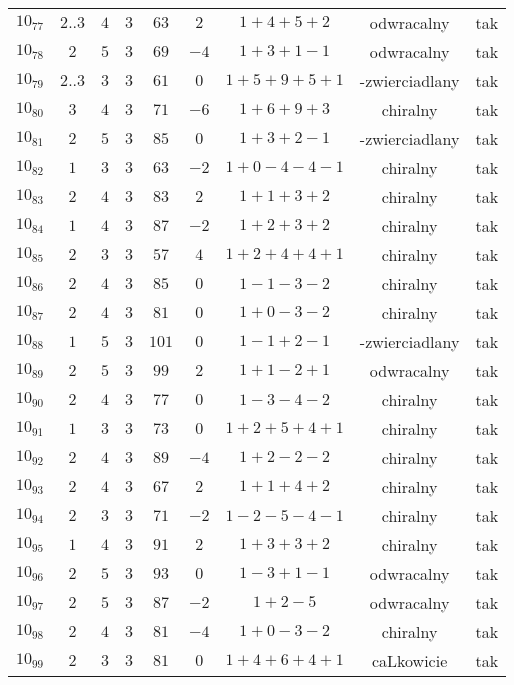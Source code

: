 \begin{longtable}{ccccccccc}
$10_{77}$ & $2..3$ & $4$ & $3$ & $63$ & $2$ & $1+4+5+2$ & odwracalny & tak \\
$10_{78}$ & $2$ & $5$ & $3$ & $69$ & $-4$ & $1+3+1-1$ & odwracalny & tak \\
$10_{79}$ & $2..3$ & $3$ & $3$ & $61$ & $0$ & $1+5+9+5+1$ & -zwierciadlany & tak \\
$10_{80}$ & $3$ & $4$ & $3$ & $71$ & $-6$ & $1+6+9+3$ & chiralny & tak \\
$10_{81}$ & $2$ & $5$ & $3$ & $85$ & $0$ & $1+3+2-1$ & -zwierciadlany & tak \\
$10_{82}$ & $1$ & $3$ & $3$ & $63$ & $-2$ & $1+0-4-4-1$ & chiralny & tak \\
$10_{83}$ & $2$ & $4$ & $3$ & $83$ & $2$ & $1+1+3+2$ & chiralny & tak \\
$10_{84}$ & $1$ & $4$ & $3$ & $87$ & $-2$ & $1+2+3+2$ & chiralny & tak \\
$10_{85}$ & $2$ & $3$ & $3$ & $57$ & $4$ & $1+2+4+4+1$ & chiralny & tak \\
$10_{86}$ & $2$ & $4$ & $3$ & $85$ & $0$ & $1-1-3-2$ & chiralny & tak \\
$10_{87}$ & $2$ & $4$ & $3$ & $81$ & $0$ & $1+0-3-2$ & chiralny & tak \\
$10_{88}$ & $1$ & $5$ & $3$ & $101$ & $0$ & $1-1+2-1$ & -zwierciadlany & tak \\
$10_{89}$ & $2$ & $5$ & $3$ & $99$ & $2$ & $1+1-2+1$ & odwracalny & tak \\
$10_{90}$ & $2$ & $4$ & $3$ & $77$ & $0$ & $1-3-4-2$ & chiralny & tak \\
$10_{91}$ & $1$ & $3$ & $3$ & $73$ & $0$ & $1+2+5+4+1$ & chiralny & tak \\
$10_{92}$ & $2$ & $4$ & $3$ & $89$ & $-4$ & $1+2-2-2$ & chiralny & tak \\
$10_{93}$ & $2$ & $4$ & $3$ & $67$ & $2$ & $1+1+4+2$ & chiralny & tak \\
$10_{94}$ & $2$ & $3$ & $3$ & $71$ & $-2$ & $1-2-5-4-1$ & chiralny & tak \\
$10_{95}$ & $1$ & $4$ & $3$ & $91$ & $2$ & $1+3+3+2$ & chiralny & tak \\
$10_{96}$ & $2$ & $5$ & $3$ & $93$ & $0$ & $1-3+1-1$ & odwracalny & tak \\
$10_{97}$ & $2$ & $5$ & $3$ & $87$ & $-2$ & $1+2-5$ & odwracalny & tak \\
$10_{98}$ & $2$ & $4$ & $3$ & $81$ & $-4$ & $1+0-3-2$ & chiralny & tak \\
$10_{99}$ & $2$ & $3$ & $3$ & $81$ & $0$ & $1+4+6+4+1$ & caLkowicie & tak \\

\end{longtable}
